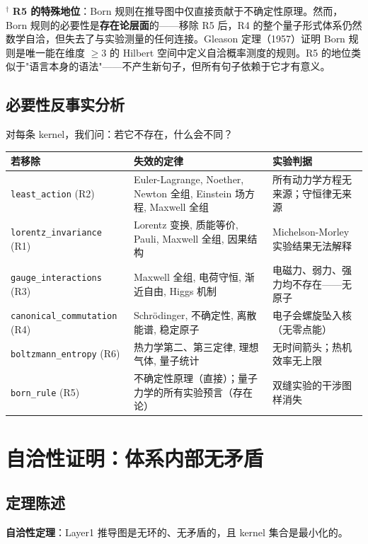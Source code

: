$^\dagger$ \textbf{R5 的特殊地位}：Born 规则在推导图中仅直接贡献于不确定性原理。然而，Born 规则的必要性是\textbf{存在论层面}的——移除 R5 后，R4 的整个量子形式体系仍然数学自洽，但失去了与实验测量的任何连接。Gleason 定理（1957）证明 Born 规则是唯一能在维度 $\geq 3$ 的 Hilbert 空间中定义自洽概率测度的规则。R5 的地位类似于"语言本身的语法"——不产生新句子，但所有句子依赖于它才有意义。

\subsection{必要性反事实分析}

对每条 kernel，我们问：若它不存在，什么会不同？

\begin{center}
\footnotesize
\begin{longtable}{p{3cm}p{6cm}p{5.5cm}}
\toprule
\textbf{若移除} & \textbf{失效的定律} & \textbf{实验判据} \\
\midrule
\texttt{least\_action} (R2) & Euler-Lagrange, Noether, Newton 全组, Einstein 场方程, Maxwell 全组 & 所有动力学方程无来源；守恒律无来源 \\
\texttt{lorentz\_invariance} (R1) & Lorentz 变换, 质能等价, Pauli, Maxwell 全组, 因果结构 & Michelson-Morley 实验结果无法解释 \\
\texttt{gauge\_interactions} (R3) & Maxwell 全组, 电荷守恒, 渐近自由, Higgs 机制 & 电磁力、弱力、强力均不存在——无原子 \\
\texttt{canonical\_commutation} (R4) & Schr\"odinger, 不确定性, 离散能谱, 稳定原子 & 电子会螺旋坠入核（无零点能） \\
\texttt{boltzmann\_entropy} (R6) & 热力学第二、第三定律, 理想气体, 量子统计 & 无时间箭头；热机效率无上限 \\
\texttt{born\_rule} (R5) & 不确定性原理（直接）；量子力学的所有实验预言（存在论） & 双缝实验的干涉图样消失 \\
\bottomrule
\end{longtable}
\end{center}

\section{自洽性证明：体系内部无矛盾}

\subsection{定理陈述}

\textbf{自洽性定理}：Layer1 推导图是无环的、无矛盾的，且 kernel 集合是最小化的。

